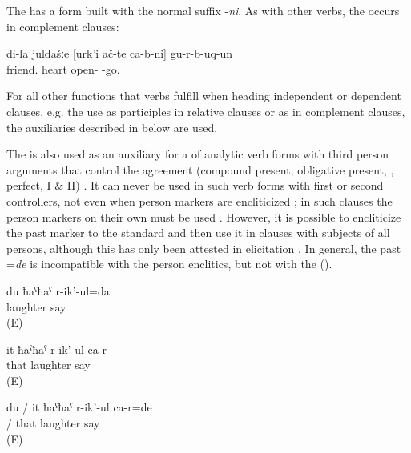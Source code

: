The  has a  form built with the normal  suffix -\textit{ni}. As with other verbs, the  occurs in complement clauses:

\begin{exe}
	\ex	\label{ex:My friends turned out to be open-hearted.}
	\gll	di-la		juldašːe		[urk'i	ač-te		ca-b-ni]			gu-r-b-uq-un\\
			friend.	heart	open- 		-go.\\
	\glt	{}
\end{exe}



For all other functions that verbs fulfill when heading independent or dependent clauses, e.g. the use as participles in relative clauses or as  in complement clauses, the auxiliaries described in  below are used. 

The  is also used as an auxiliary for a  of analytic verb forms with third person arguments that control the agreement (compound present, obligative present, , perfect,  I \& II) . It can never be used in such verb forms with first or second  controllers, not even when person markers are encliticized ; in such clauses the person markers on their own must be used . However, it is possible to encliticize the past marker  to the standard  and then use it in clauses with subjects of all persons, although this has only been attested in elicitation . In general, the past  =\textit{de} is incompatible with the person enclitics, but not with the  ().
%
\begin{exe}

	\ex	\label{ex:I am laughing}
	\gll	du	ħaˁħaˁ	r-ik'-ul=da\\
			laughter say\\
	\glt	{} (E)

	\ex	\label{ex:She is laughing}
	\gll	it	ħaˁħaˁ	r-ik'-ul	ca-r\\
		that	laughter say	\\
	\glt	{} (E)

	\ex	\label{ex:I was / She was laughing}
	\gll	du	/	it	ħaˁħaˁ	r-ik'-ul	ca-r=de\\
			/	that	laughter say	\\
	\glt	{} (E)
\end{exe}


